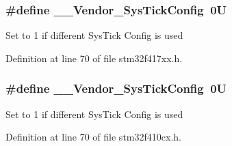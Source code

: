 \subsubsection[{\texorpdfstring{\+\_\+\+\_\+\+Vendor\+\_\+\+Sys\+Tick\+Config}{__Vendor_SysTickConfig}}]{\setlength{\rightskip}{0pt plus 5cm}\#define \+\_\+\+\_\+\+Vendor\+\_\+\+Sys\+Tick\+Config~0U}\hypertarget{group___configuration__section__for___c_m_s_i_s_gab58771b4ec03f9bdddc84770f7c95c68}{}\label{group___configuration__section__for___c_m_s_i_s_gab58771b4ec03f9bdddc84770f7c95c68}
Set to 1 if different Sys\+Tick Config is used 

Definition at line 70 of file stm32f417xx.\+h.

\subsubsection[{\texorpdfstring{\+\_\+\+\_\+\+Vendor\+\_\+\+Sys\+Tick\+Config}{__Vendor_SysTickConfig}}]{\setlength{\rightskip}{0pt plus 5cm}\#define \+\_\+\+\_\+\+Vendor\+\_\+\+Sys\+Tick\+Config~0U}\hypertarget{group___configuration__section__for___c_m_s_i_s_gab58771b4ec03f9bdddc84770f7c95c68}{}\label{group___configuration__section__for___c_m_s_i_s_gab58771b4ec03f9bdddc84770f7c95c68}
Set to 1 if different Sys\+Tick Config is used 

Definition at line 70 of file stm32f410cx.\+h.

